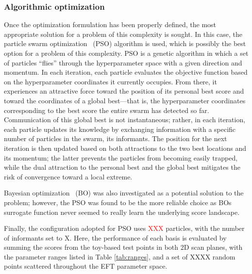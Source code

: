 \subsubsection{Algorithmic optimization}
%
Once the optimization formulation has been properly defined, the most appropriate solution for a problem of this complexity is sought. In this case, the particle swarm optimization~\cite{488968,Tani:2020dyi} (PSO) algorithm is used, which is possibly the best option for a problem of this complexity. PSO is a genetic algorithm in which a set of particles “flies” through the hyperparameter space with a given direction and momentum. In each iteration, each particle evaluates the objective function based on the hyperparameter coordinates it currently occupies. From there, it experiences an attractive force toward the position of its personal best score and toward the coordinates of a global best—that is, the hyperparameter coordinates corresponding to the best score the entire swarm has detected so far. Communication of this global best is not instantaneous; rather, in each iteration, each particle updates its knowledge by exchanging information with a specific number of particles in the swarm, its informants. The position for the next iteration is then updated based on both attractions to the two best locations and its momentum; the latter prevents the particles from becoming easily trapped, while the dual attraction to the personal best and the global best mitigates the risk of convergence toward a local extreme.

Bayesian optimization~\cite{BayesPaper1,BayesBook,Tani:2022izz} (BO) was also investigated as a potential solution to the problem; however, the PSO was found to be the more reliable choice as BOs surrogate function never seemed to really learn the underlying score landscape.

Finally, the configuration adopted for PSO uses \textcolor{red}{XXX} particles, with the number of informants set to X. Here, the performance of each basis is evaluated by summing the scores from the toy-based test points in both 2D scan planes, with the parameter ranges listed in Table \ref{tab:ranges}, and a set of XXXX random points scattered throughout the EFT parameter space.\\


